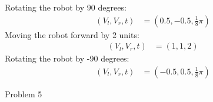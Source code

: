 \documentclass[answers]{exam}
\begin{document}
\begin{questions}
\begin{parts}
\begin{solution}
            Rotating the robot by 90 degrees:
            \begin{align*}
                (V_l, V_r, t) & = (0.5, -0.5, \frac{1}{8} \pi)
            \end{align*}
            Moving the robot forward by 2 units:
            \begin{align*}
                (V_l, V_r, t) & = (1, 1, 2)
            \end{align*}
            Rotating the robot by -90 degrees:
            \begin{align*}
                (V_l, V_r, t) & = (-0.5, 0.5, \frac{1}{8} \pi)
            \end{align*}
        \end{solution}
    \end{parts}
    \question Problem 5

\end{questions}
\end{document}
